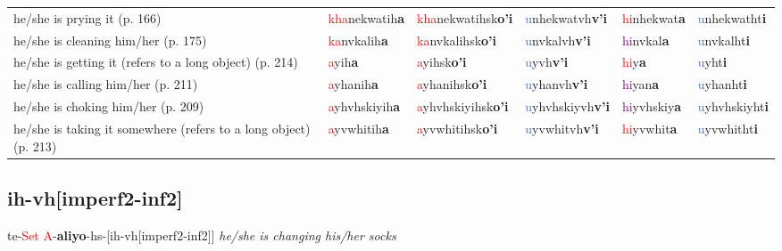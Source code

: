 \documentclass[oneside,openany]{book}%
\begin{document}
\begin{tabularx}{\textwidth}{>{\hsize=1.5\hsize\RaggedRight}X >{\hsize=0.9\hsize}X >{\hsize=0.9\hsize}X >{\hsize=0.9\hsize}X >{\hsize=0.9\hsize}X >{\hsize=0.9\hsize}X}
he/she is prying it (p. 166)&\textcolor{Red}{kha}nekwatih\textbf{a}&\textcolor{Red}{kha}nekwatihsk\textbf{o'i}&\textcolor{RoyalBlue}{u}nhekwatvh\textbf{v'i}&\textcolor{Red}{hi}nhekwat\textbf{a}&\textcolor{RoyalBlue}{u}nhekwatht\textbf{i}\\%
he/she is cleaning him/her (p. 175)&\textcolor{Red}{ka}nvkalih\textbf{a}&\textcolor{Red}{ka}nvkalihsk\textbf{o'i}&\textcolor{RoyalBlue}{u}nvkalvh\textbf{v'i}&\textcolor{Purple}{hi}nvkal\textbf{a}&\textcolor{RoyalBlue}{u}nvkalht\textbf{i}\\%
he/she is getting it (refers to a long object) (p. 214)&\textcolor{Red}{a}yih\textbf{a}&\textcolor{Red}{a}yihsk\textbf{o'i}&\textcolor{RoyalBlue}{u}yvh\textbf{v'i}&\textcolor{Red}{hi}y\textbf{a}&\textcolor{RoyalBlue}{u}yht\textbf{i}\\%
he/she is calling him/her (p. 211)&\textcolor{Red}{a}yhanih\textbf{a}&\textcolor{Red}{a}yhanihsk\textbf{o'i}&\textcolor{RoyalBlue}{u}yhanvh\textbf{v'i}&\textcolor{Purple}{hi}yan\textbf{a}&\textcolor{RoyalBlue}{u}yhanht\textbf{i}\\%
he/she is choking him/her (p. 209)&\textcolor{Red}{a}yhvhskiyih\textbf{a}&\textcolor{Red}{a}yhvhskiyihsk\textbf{o'i}&\textcolor{RoyalBlue}{u}yhvhskiyvh\textbf{v'i}&\textcolor{Purple}{hi}yvhskiy\textbf{a}&\textcolor{RoyalBlue}{u}yhvhskiyht\textbf{i}\\%
he/she is taking it somewhere (refers to a long object) (p. 213)&\textcolor{Red}{a}yvwhitih\textbf{a}&\textcolor{Red}{a}yvwhitihsk\textbf{o'i}&\textcolor{RoyalBlue}{u}yvwhitvh\textbf{v'i}&\textcolor{Red}{hi}yvwhit\textbf{a}&\textcolor{RoyalBlue}{u}yvwhitht\textbf{i}\\%
\bottomrule%
\end{tabularx}%
\vspace{1em}%
\needspace{1in}%
\subsection*{ih-vh[imperf2-inf2]}%
te{-}\textcolor{Red}{Set A}{-}\textbf{aliyo}{-}hs{-}[ih-vh[imperf2-inf2]] \textit{ he/she is changing his/her socks} \\%
\vspace{1em}%
\needspace{1in}%
\end{document}
